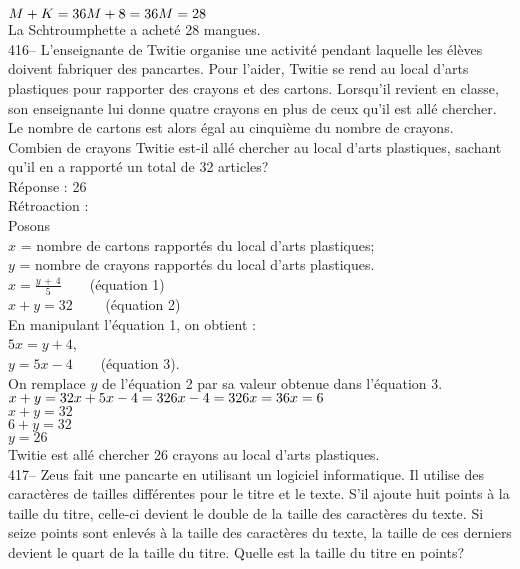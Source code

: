 ﻿\documentclass[letterpaper, 12pt]{article}
\begin{document}
$M+K=36\\
M+8=36\\
M=28$\\
La Schtroumphette a achet\'e 28 mangues.\\

416-- L'enseignante de Twitie organise une activit\'e pendant laquelle les
\'el\`eves doivent fabriquer des pancartes.  Pour l'aider, Twitie se rend au
local d'arts plastiques pour rapporter des crayons et des cartons.
Lorsqu'il revient en classe, son enseignante lui donne quatre crayons en
plus de ceux qu'il est all\'e chercher.  Le nombre de cartons est alors
\'egal au cinqui\`eme du nombre de crayons.  Combien de crayons Twitie
est-il all\'e chercher au local d'arts plastiques, sachant qu'il en a
rapport\'e un total de 32 articles?\\

R\'eponse : 26\\

R\'etroaction : \\
Posons\\
$x$ = nombre de cartons rapport\'es du local d'arts plastiques;\\
$y$ = nombre de crayons rapport\'es du local d'arts plastiques.\\

$x=\frac{y\,+\,4}{5}  \qquad $(\'equation 1)\\
$x+y=32 \qquad $ (\'equation 2)\\

En manipulant l'\'equation 1, on obtient : \\
$5x=y+4$,\\
$y=5x-4  \qquad $(\'equation 3).\\

On remplace $y$ de l'\'equation 2 par sa valeur obtenue dans l'\'equation
3.\\
$x+y=32\\
x+5x-4=32\\
6x-4=32\\
6x=36\\
x=6$\\

$x+y=32$\\
$6+y=32$\\
$y=26$\\

Twitie est all\'e chercher 26 crayons au local d'arts plastiques.\\

417-- Zeus fait une pancarte en utilisant un logiciel informatique.  Il
utilise des caract\`eres de tailles diff\'erentes pour le titre et le texte.
  S'il ajoute huit points \`a la taille du titre, celle-ci devient le double
de la taille des caract\`eres du texte.  Si seize points sont enlev\'es \`a
la taille des caract\`eres du texte, la taille de ces derniers devient le
quart de la taille du titre.  Quelle est la taille du titre en points?\\
\end{document}
